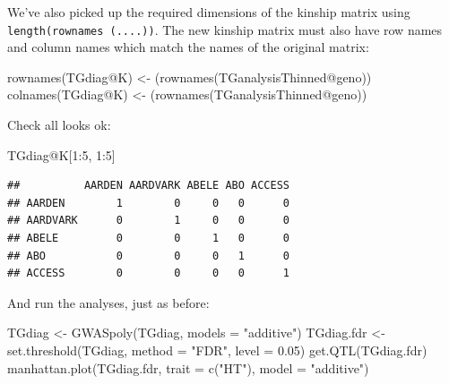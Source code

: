 \documentclass[
]{book}
\newenvironment{Shaded}{\begin{snugshade}}{\end{snugshade}}
\newcommand{\AttributeTok}[1]{\textcolor[rgb]{0.77,0.63,0.00}{#1}}
\newcommand{\DecValTok}[1]{\textcolor[rgb]{0.00,0.00,0.81}{#1}}
\newcommand{\FloatTok}[1]{\textcolor[rgb]{0.00,0.00,0.81}{#1}}
\newcommand{\FunctionTok}[1]{\textcolor[rgb]{0.00,0.00,0.00}{#1}}
\newcommand{\NormalTok}[1]{#1}
\newcommand{\OtherTok}[1]{\textcolor[rgb]{0.56,0.35,0.01}{#1}}
\newcommand{\SpecialCharTok}[1]{\textcolor[rgb]{0.00,0.00,0.00}{#1}}
\newcommand{\StringTok}[1]{\textcolor[rgb]{0.31,0.60,0.02}{#1}}
\begin{document}
We've also picked up the required dimensions of the kinship matrix using \texttt{length(rownames\ (....))}. The new kinship matrix must also have row names and column names which match the names of the original matrix:

\begin{Shaded}
\begin{Highlighting}[]
\FunctionTok{rownames}\NormalTok{(TGdiag}\SpecialCharTok{@}\NormalTok{K) }\OtherTok{\textless{}{-}}\NormalTok{ (}\FunctionTok{rownames}\NormalTok{(TGanalysisThinned}\SpecialCharTok{@}\NormalTok{geno))}
\FunctionTok{colnames}\NormalTok{(TGdiag}\SpecialCharTok{@}\NormalTok{K) }\OtherTok{\textless{}{-}}\NormalTok{ (}\FunctionTok{rownames}\NormalTok{(TGanalysisThinned}\SpecialCharTok{@}\NormalTok{geno))}
\end{Highlighting}
\end{Shaded}

Check all looks ok:

\begin{Shaded}
\begin{Highlighting}[]
\NormalTok{TGdiag}\SpecialCharTok{@}\NormalTok{K[}\DecValTok{1}\SpecialCharTok{:}\DecValTok{5}\NormalTok{, }\DecValTok{1}\SpecialCharTok{:}\DecValTok{5}\NormalTok{]}
\end{Highlighting}
\end{Shaded}

\begin{verbatim}
##          AARDEN AARDVARK ABELE ABO ACCESS
## AARDEN        1        0     0   0      0
## AARDVARK      0        1     0   0      0
## ABELE         0        0     1   0      0
## ABO           0        0     0   1      0
## ACCESS        0        0     0   0      1
\end{verbatim}

And run the analyses, just as before:

\begin{Shaded}
\begin{Highlighting}[]
\NormalTok{TGdiag }\OtherTok{\textless{}{-}} \FunctionTok{GWASpoly}\NormalTok{(TGdiag, }\AttributeTok{models =} \StringTok{"additive"}\NormalTok{)}
\NormalTok{TGdiag.fdr }\OtherTok{\textless{}{-}} \FunctionTok{set.threshold}\NormalTok{(TGdiag, }\AttributeTok{method =} \StringTok{"FDR"}\NormalTok{, }\AttributeTok{level =} \FloatTok{0.05}\NormalTok{)}
\FunctionTok{get.QTL}\NormalTok{(TGdiag.fdr)}
\FunctionTok{manhattan.plot}\NormalTok{(TGdiag.fdr, }\AttributeTok{trait =} \FunctionTok{c}\NormalTok{(}\StringTok{"HT"}\NormalTok{), }\AttributeTok{model =} \StringTok{"additive"}\NormalTok{)}
\end{Highlighting}
\end{Shaded}
\end{document}
